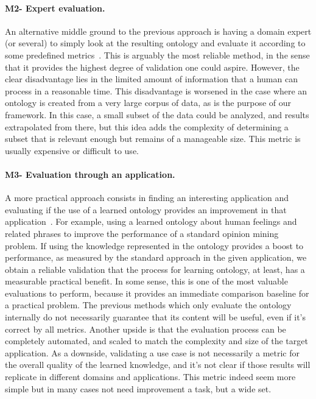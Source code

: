     \paragraph{M2- Expert evaluation.}
    An alternative middle ground to the previous approach is having a domain
    expert (or several) to simply look at the resulting ontology and evaluate
    it according to some predefined metrics~\cite{ROSPOCHER2016132}.
    This is arguably the most reliable method, in the sense that it provides
    the highest degree of validation one could aspire. However, the clear
    disadvantage lies in the limited amount of information that a human can
    process in a reasonable time. This disadvantage is worsened in the case
    where an ontology is created from a very large corpus of data, as is
    the purpose of our framework. In this case, a small subset of the data
    could be analyzed, and results extrapolated from there, but this idea
    adds the complexity of determining a subset that is relevant enough but
    remains of a manageable size.
    This metric is usually expensive or difficult to use.

    \paragraph{M3- Evaluation through an application.}
    A more practical approach consists in finding an interesting application and
    evaluating if the use of a learned ontology provides an improvement in that
    application~\cite{gurevych2003semantic}. For example, using a learned ontology
    about human feelings and related phrases to improve the performance of a
    standard opinion mining problem. If using the knowledge represented in the
    ontology provides a boost to performance, as measured by the standard
    approach in the given application, we obtain a reliable validation that
    the process for learning ontology, at least, has a measurable practical benefit.
    In some sense, this is one of the most valuable evaluations to perform,
    because it provides an immediate comparison baseline for a practical problem.
    The previous methods which only evaluate the ontology internally do not
    necessarily guarantee that its content will be useful, even if it's correct by
    all metrics. Another upside is that the evaluation process can be completely
    automated, and scaled to match the complexity and size of the target application.
    As a downside, validating a use case is not necessarily a metric for the overall
    quality of the learned knowledge, and it's not clear if those results will
    replicate in different domains and applications.
    This metric indeed seem more simple but in many cases not need
    improvement a task, but a wide set.

